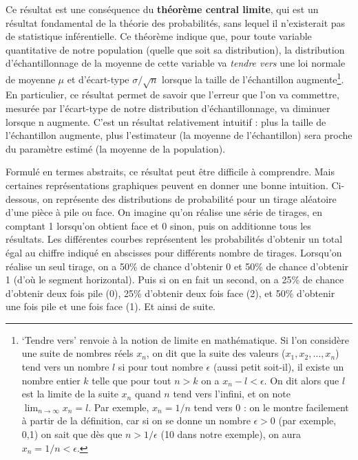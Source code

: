 \documentclass[
]{book}
\begin{document}
Ce résultat est une conséquence du \textbf{théorème central limite}, qui est un résultat fondamental de la théorie des probabilités, sans lequel il n'existerait pas de statistique inférentielle. Ce théorème indique que, pour toute variable quantitative de notre population (quelle que soit sa distribution), la distribution d'échantillonnage de la moyenne de cette variable va \emph{tendre vers} une loi normale de moyenne \(\mu\) et d'écart-type \(\sigma/{\sqrt{n}}\) lorsque la taille de l'échantillon augmente\footnote{`Tendre vers' renvoie à la notion de limite en mathématique. Si l'on considère une suite de nombres réels \(x_n\), on dit que la suite des valeurs (\(x_1, x_2, …, x_n\)) tend vers un nombre \(l\) si pour tout nombre \(\epsilon\) (aussi petit soit-il), il existe un nombre entier \(k\) telle que pour tout \(n > k\) on a \(x_n - l < \epsilon\). On dit alors que \(l\) est la limite de la suite \(x_n\) quand \(n\) tend vers l'infini, et on note \(\lim_{n\to\infty} x_n = l\). Par exemple, \(x_n = 1/n\) tend vers 0 : on le montre facilement à partir de la définition, car si on se donne un nombre \(\epsilon > 0\) (par exemple, 0,1) on sait que dès que \(n > 1/\epsilon\) (10 dans notre exemple), on aura \(x_n = 1/n < \epsilon\).}. En particulier, ce résultat permet de savoir que l'erreur que l'on va commettre, mesurée par l'écart-type de notre distribution d'échantillonnage, va diminuer lorsque n augmente. C'est un résultat relativement intuitif : plus la taille de l'échantillon augmente, plus l'estimateur (la moyenne de l'échantillon) sera proche du paramètre estimé (la moyenne de la population).

Formulé en termes abstraits, ce résultat peut être difficile à comprendre. Mais certaines représentations graphiques peuvent en donner une bonne intuition. Ci-dessous, on représente des distributions de probabilité pour un tirage aléatoire d'une pièce à pile ou face. On imagine qu'on réalise une série de tirages, en comptant 1 lorsqu'on obtient face et 0 sinon, puis on additionne tous les résultats. Les différentes courbes représentent les probabilités d'obtenir un total égal au chiffre indiqué en abscisses pour différents nombre de tirages. Lorsqu'on réalise un seul tirage, on a 50\% de chance d'obtenir 0 et 50\% de chance d'obtenir 1 (d'où le segment horizontal). Puis si on en fait un second, on a 25\% de chance d'obtenir deux fois pile (0), 25\% d'obtenir deux fois face (2), et 50\% d'obtenir une fois pile et une fois face (1). Et ainsi de suite.
\end{document}
